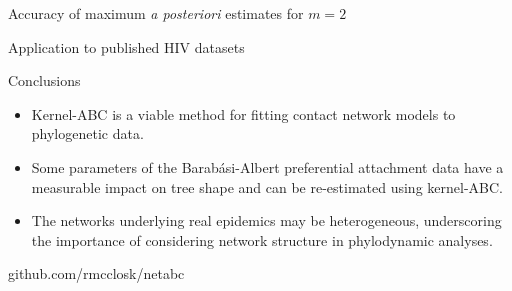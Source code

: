 \documentclass{beamer}
\newcommand{\tablepath}{../tables}
\begin{document}
\begin{frame}{Accuracy of maximum \textit{a posteriori} estimates for $m = 2$}
  \begin{minipage}[p][\textheight][t]{\textwidth}
    \vspace{-0.5cm}
  \end{minipage}
\end{frame}

\begin{frame}{Application to published HIV datasets}
  \vspace{0.5cm}

  \scriptsize
  
  \normalsize
\end{frame}

\begin{frame}{Conclusions}
  \begin{itemize}
    \item Kernel-ABC is a viable method for fitting contact network models to
      phylogenetic data.
      \pause
    \item Some parameters of the Barab\'asi-Albert preferential attachment data
      have a measurable impact on tree shape and can be re-estimated using
      kernel-ABC.
      \pause
    \item The networks underlying real epidemics may be heterogeneous,
      underscoring the importance of considering network structure in
      phylodynamic analyses.
      \pause
  \end{itemize}
  \centerline{ github.com/rmcclosk/netabc}
\end{frame}
\end{document}
